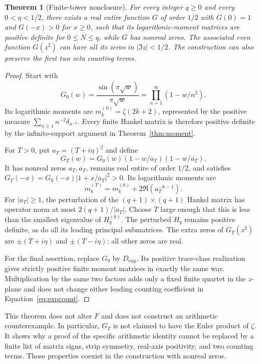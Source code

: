 \documentclass[11pt,letterpaper]{article}
\numberwithin{equation}{section}
\newtheorem{theorem}{Theorem}[section]
\theoremstyle{definition}
\theoremstyle{remark}
\begin{document}
\begin{theorem}[Finite-tower nonclosure]
\label{thm:finite}
For every integer $q\geq0$ and every $0<\eta<1/2$, there exists a real entire function $G$ of order $1/2$ with $G(0)=1$ and $G(-x)>0$ for $x\geq0$, such that its logarithmic-moment matrices are positive definite for $0\leq N\leq q$, while $G$ has nonreal zeros. The associated even function $G(z^2)$ can have all its zeros in $|\Im z|<1/2$. The construction can also preserve the first two zeta counting terms.
\end{theorem}
\begin{proof}
Start with
\begin{equation}
 G_0(w)=\frac{\sin(\pi\sqrt w)}{\pi\sqrt w}
       =\prod_{n=1}^{\infty}(1-w/n^2).
 \label{eq:sinebase}
\end{equation}
Its logarithmic moments are $m_k^{(0)}=\zeta(2k+2)$, represented by the positive measure $\sum_{n\geq1}n^{-2}\delta_{n^{-2}}$. Every finite Hankel matrix is therefore positive definite by the infinite-support argument in Theorem~\ref{thm:moment}.

For $T>0$, put $a_T=(T+i\eta)^2$ and define
\begin{equation}
 G_T(w)=G_0(w)(1-w/a_T)(1-w/\overline{a_T}).
 \label{eq:finiteperturb}
\end{equation}
It has nonreal zeros $a_T,\overline{a_T}$, remains real entire of order $1/2$, and satisfies
$G_T(-x)=G_0(-x)|1+x/a_T|^2>0$. Its logarithmic moments are
\begin{equation}
 m_k^{(T)}=m_k^{(0)}+2\Re(a_T^{-k-1}).
 \label{eq:momentperturb}
\end{equation}
For $|a_T|\geq1$, the perturbation of the $(q+1)\times(q+1)$ Hankel matrix has operator norm at most $2(q+1)/|a_T|$. Choose $T$ large enough that this is less than the smallest eigenvalue of $H_q^{(0)}$. The perturbed $H_q$ remains positive definite, as do all its leading principal submatrices. The extra zeros of $G_T(z^2)$ are $\pm(T+i\eta)$ and $\pm(T-i\eta)$; all other zeros are real.

For the final assertion, replace $G_0$ by $D_{\mathrm{exp}}$. Its positive trace-class realization gives strictly positive finite moment matrices in exactly the same way. Multiplication by the same two factors adds only a fixed finite quartet in the $z$-plane and does not change either leading counting coefficient in Equation~\eqref{eq:expcount}.
\end{proof}

This theorem does not alter $F$ and does not construct an arithmetic counterexample. In particular, $G_T$ is not claimed to have the Euler product of $\zeta$. It shows why a proof of the specific arithmetic identity cannot be replaced by a finite list of matrix signs, strip symmetry, real-axis positivity, and two counting terms. Those properties coexist in the construction with nonreal zeros.
\end{document}
